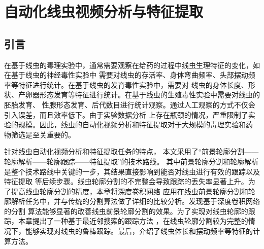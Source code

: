 \chapter{自动化线虫视频分析与特征提取}
\section{引言}
	在基于线虫的毒理实验中，通常需要观察在给药的过程中线虫生理特征的变化，如在基于线虫的神经毒性实验中
	需要对线虫的存活率、身体弯曲频率、头部摆动频率等特征进行统计。在基于线虫的发育毒性实验中，需要对
	线虫的身体长度、形状、产卵器形态发育等特征进行统计。在基于线虫的生殖毒性实验中需要对线虫的胚胎发育、
	性腺形态发育、后代数目进行统计观察。通过人工观察的方式不仅会引入误差，而且效率低下。由于实验数据分析
	上存在瓶颈的情况，严重限制了实验的规模。因此，线虫的自动化视频分析和特征提取对于大规模的毒理实验和药
	物筛选是至关重要的。
	
	针对线虫自动化视频分析和特征提取任务的特点，
	本文采用了“前景轮廓分割——轮廓解析——轮廓跟踪——特征提取”的技术路线。
	其中前景轮廓分割和轮廓解析是整个技术路线中关键的一步，其结果直接影响到能否对线虫进行有效的跟踪以及特征提取
	等后续步骤。线虫轮廓分割的不完整会导致跟踪的丢失率显著上升。为了提高线虫轮廓分割的精度，本章将深度卷积网络
	应用在线虫前景轮廓分割和轮廓解析任务中，并与传统的分割算法做了详细的比较分析。发现基于深度卷积网络的分割
	算法能够显著的改善线虫前景轮廓分割的效果。为了实现对线虫轮廓的跟踪，本章提出了一种基于最近邻搜索的跟踪方法
	，在线虫轮廓分割较为完整的情况下，能够实现对线虫的鲁棒跟踪。最后，介绍了线虫体长和摆动频率等特征的计算方法。

